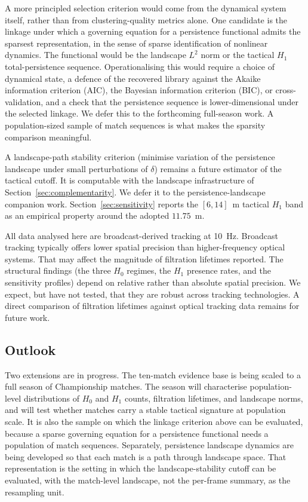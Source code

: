 A more principled selection criterion would come from the dynamical
system itself, rather than from clustering-quality metrics alone. One
candidate is the linkage under which a governing equation for a
persistence functional admits the sparsest representation, in the
sense of sparse identification of nonlinear dynamics. The functional
would be the landscape $L^2$ norm or the tactical $H_1$
total-persistence sequence. Operationalising this would require a
choice of dynamical state, a defence of the recovered library against
the Akaike information criterion (AIC), the Bayesian information
criterion (BIC), or cross-validation, and a check that the persistence
sequence is lower-dimensional under the selected linkage. We defer this
to the forthcoming full-season work. A population-sized sample of
match sequences is what makes the sparsity comparison meaningful.

A landscape-path stability criterion (minimise variation of the
persistence landscape under small perturbations of $\delta$) remains a
future estimator of the tactical cutoff. It is computable with the
landscape infrastructure of Section~\ref{sec:complementarity}. We
defer it to the persistence-landscape companion work.
Section~\ref{sec:sensitivity} reports the $[6,14]$~m tactical
$H_1$ band as an empirical property around the adopted $11.75$~m.

All data analysed here are broadcast-derived tracking at 10~Hz.
Broadcast tracking typically offers lower spatial precision than
higher-frequency optical systems. That may affect the magnitude of
filtration lifetimes reported. The structural findings (the three
$H_0$ regimes, the $H_1$ presence rates, and the sensitivity profiles)
depend on relative rather than absolute spatial precision. We expect,
but have not tested, that they are robust across tracking technologies.
A direct comparison of filtration lifetimes against optical tracking
data remains for future work.

\subsection{Outlook}

Two extensions are in progress. The ten-match evidence base is being scaled
to a full season of Championship matches. The season will characterise
population-level distributions of $H_0$ and $H_1$ counts, filtration
lifetimes, and landscape norms, and will test whether matches carry a
stable tactical signature at population scale. It is also the sample
on which the linkage criterion above can be evaluated, because a sparse
governing equation for a persistence functional needs a population of
match sequences. Separately, persistence landscape dynamics are being
developed so that each match is a path through landscape space. That
representation is the setting in which the landscape-stability cutoff
can be evaluated, with the match-level landscape, not the per-frame
summary, as the resampling unit.
